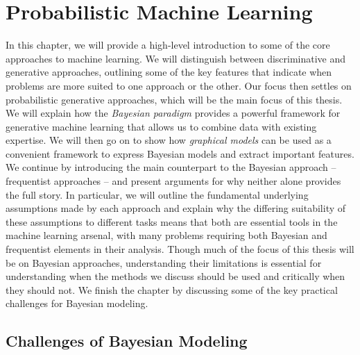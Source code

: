 %
%	


\chapter{Probabilistic Machine Learning}
\label{chp:bayes}

In this chapter, we will provide a high-level introduction to  some of the core approaches to
machine learning.  We will distinguish between discriminative and generative approaches,
outlining some of the key features that indicate when problems are more suited to one approach
or the other.  Our focus then settles on probabilistic generative approaches, which
will be the main focus of this thesis.  We will explain how the \emph{Bayesian paradigm} provides
a powerful framework for generative machine learning that allows us to combine data with existing
expertise.  We will then go on to show how \emph{graphical models} can be used as a convenient
framework to express Bayesian models and extract important features.  
We continue by introducing the main counterpart to the Bayesian approach -- frequentist
approaches -- and present arguments for why neither alone provides the full story.
In particular, we will outline the fundamental underlying
assumptions made by each approach and explain why the differing suitability of these
assumptions to different tasks means that both are  essential tools in the machine learning
arsenal, with many problems requiring both Bayesian and frequentist elements in their analysis.
Though much of the focus of this thesis will be on Bayesian approaches, understanding their limitations
is essential for understanding when the methods we discuss should be used and critically when they
should not.  We finish the chapter by discussing some of the key practical challenges for Bayesian modeling.







\section{Challenges of Bayesian Modeling}
\label{sec:bayes:challenges}

